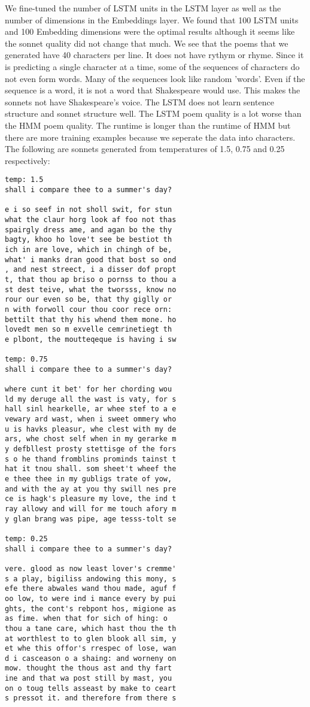 We fine-tuned the number of LSTM units in the LSTM layer as well as the number of dimensions in the Embeddings layer. We found that 100 LSTM units and 100 Embedding dimensions were the optimal results although it seems like the sonnet quality did not change that much. We see that the poems that we generated have 40 characters per line. It does not have rythym or rhyme. Since it is predicting a single character at a time, some of the sequences of characters do not even form words. Many of the sequences look like random 'words'. Even if the sequence is a word, it is not a word that Shakespeare would use. This makes the sonnets not have Shakespeare's voice. The LSTM does not learn sentence structure and sonnet structure well. The LSTM poem quality is a lot worse than the HMM poem quality. The runtime is longer than the runtime of HMM but there are more training examples because we seperate the data into characters. 
The following are sonnets generated from temperatures of 1.5, 0.75 and 0.25 respectively:
\begin{verbatim}
temp: 1.5 
shall i compare thee to a summer's day?

e i so seef in not sholl swit, for stun 
what the claur horg look af foo not thas
spairgly dress ame, and agan bo the thy
bagty, khoo ho love't see be bestiot th
ich in are love, which in chingh of be, 
what' i manks dran good that bost so ond
, and nest streect, i a disser dof propt
t, that thou ap briso o pornss to thou a
st dest teive, what the tworsss, know no
rour our even so be, that thy giglly or
n with forwoll cour thou coor rece orn: 
bettilt that thy his whend them mone. ho
lovedt men so m exvelle cemrinetiegt th
e plbont, the moutteqeque is having i sw

temp: 0.75
shall i compare thee to a summer's day?

where cunt it bet' for her chording wou
ld my deruge all the wast is vaty, for s
hall sinl hearkelle, ar whee stef to a e
vewary ard wast, when i sweet ommery who
u is havks pleasur, whe clest with my de
ars, whe chost self when in my gerarke m
y defbllest prosty stettisge of the fors
s o he thand fromblins prominds tainst t
hat it tnou shall. som sheet't wheef the
e thee thee in my gubligs trate of yow, 
and with the ay at you thy swill nes pre
ce is hagk's pleasure my love, the ind t
ray allowy and will for me touch afory m
y glan brang was pipe, age tesss-tolt se

temp: 0.25
shall i compare thee to a summer's day?

vere. glood as now least lover's cremme'
s a play, bigiliss andowing this mony, s
efe there abwales wand thou made, aguf f
oo low, to were ind i mance every by pui
ghts, the cont's rebpont hos, migione as
as fime. when that for sich of hing: o 
thou a tane care, which hast thou the th
at worthlest to to glen blook all sim, y
et whe this offor's rrespec of lose, wan
d i casceason o a shaing: and worneny on
mow. thought the thous ast and thy fart
ine and that wa post still by mast, you 
on o toug tells asseast by make to ceart
s pressot it. and therefore from there s
\end{verbatim}

